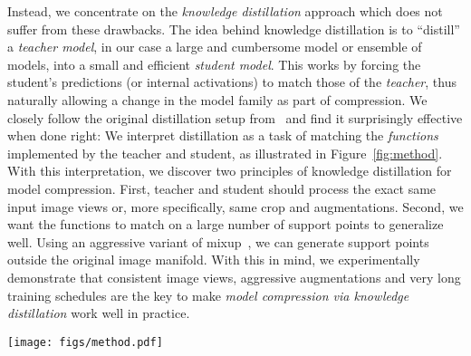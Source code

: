 \documentclass[10pt,twocolumn,letterpaper]{article}
\begin{document}
Instead, we concentrate on the \emph{knowledge distillation} approach which does not suffer from these drawbacks.
The idea behind knowledge distillation is to ``distill'' a \textit{teacher model}, in our case a large and cumbersome model or ensemble of models, into a small and efficient \textit{student model}.
This works by forcing the student's predictions (or internal activations) to match those of the \emph{teacher}, thus naturally allowing a change in the model family as part of compression.
We closely follow the original distillation setup from~\cite{hinton} and find it surprisingly effective when done right: We interpret distillation as a task of matching the \emph{functions} implemented by the teacher and student, as illustrated in Figure~\ref{fig:method}. With this interpretation, we discover two principles of knowledge distillation for model compression. First, teacher and student should process the exact same input image views or, more specifically, same crop and augmentations. Second, we want the functions to match on a large number of support points to generalize well. Using an aggressive variant of mixup~\cite{zhang2018mixup}, we can generate support points outside the original image manifold. With this in mind, we experimentally demonstrate that consistent image views, aggressive augmentations and very long training schedules are the key to make \emph{model compression via knowledge distillation} work well in practice.

\begin{figure*}[t]\centering
    \texttt{[image: figs/method.pdf]}\vspace{-1em}
    \caption{Schematic illustrations of various design choices when doing knowledge distillation. \textcolor{fixedcolor}{\textbf{Left}}: \emph{Teacher} receives a fixed image, while \emph{student} receives a random augmentation. \textcolor{indepcolor}{\textbf{Center-left}}: \emph{Teacher} and \emph{student} receive independent image augmentations. \textcolor{consicolor}{\textbf{Center-right}}: \emph{Teacher} and \emph{student} receive consistent image augmentations. \textcolor{fnmatcolor}{\textbf{Right}}: \emph{Teacher} and \emph{student} receive consistent image augmentations plus the input image manifold is extended by including linear segments between pairs of images (known as \emph{mixup}~\cite{zhang2018mixup} augmentation).}\vspace{-1em}
    \label{fig:method}\end{figure*}
\end{document}
